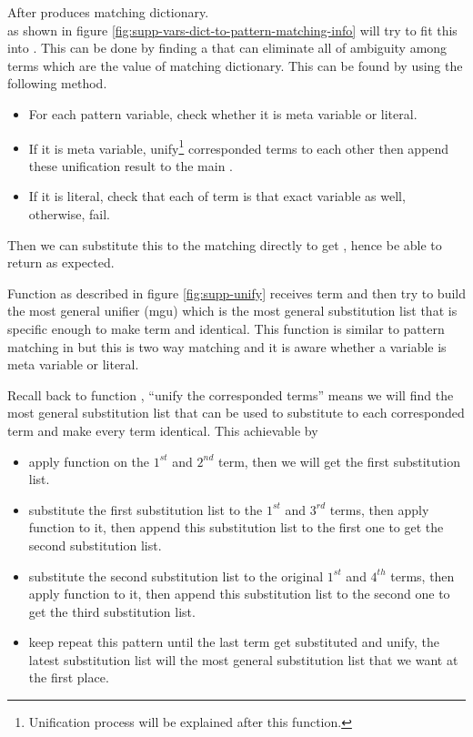 \documentclass[master.tex]{subfiles}
\begin{document}
After  produces matching dictionary. \\
 as shown in figure
\ref{fig:supp-vars-dict-to-pattern-matching-info} will try to fit this into
. This can be done by finding a
 that can eliminate all of ambiguity among terms which
are the value of matching dictionary. This  can be found
by using the following method.
\begin{itemize}
\item For each pattern variable, check whether it is meta variable or literal.
\item If it is meta variable, unify\footnote{Unification process will be
    explained after this function.} corresponded terms to each other then append
  these unification result to the main .
\item If it is literal, check that each of term is that exact variable as well,
  otherwise, fail.
\end{itemize}

Then we can substitute this  to the matching directly to
get , hence be able to return
 as expected.

Function  as described in figure \ref{fig:supp-unify} receives term
 and  then try to build the most general unifier (mgu) which
is the most general substitution list that is specific enough to make term
 and  identical. This function is similar to pattern matching
in  but this is two way matching and it
is aware whether a variable is meta variable or literal.

Recall back to function , ``unify
the corresponded terms'' means we will find the most general substitution list
that can be used to substitute to each corresponded term and make every term
identical. This achievable by
\begin{itemize}
\item apply function  on the $1^{st}$ and $2^{nd}$ term, then we
  will get the first substitution list.
\item substitute the first substitution list to the $1^{st}$ and $3^{rd}$ terms,
  then apply function  to it, then append this substitution list to
  the first one to get the second substitution list.
\item substitute the second substitution list to the original $1^{st}$ and $4^{th}$
  terms, then apply function  to it, then append this substitution
  list to the second one to get the third substitution list.
\item keep repeat this pattern until the last term get substituted and unify, the
  latest substitution list will the most general substitution list that we want
  at the first place.
\end{itemize}
\end{document}
